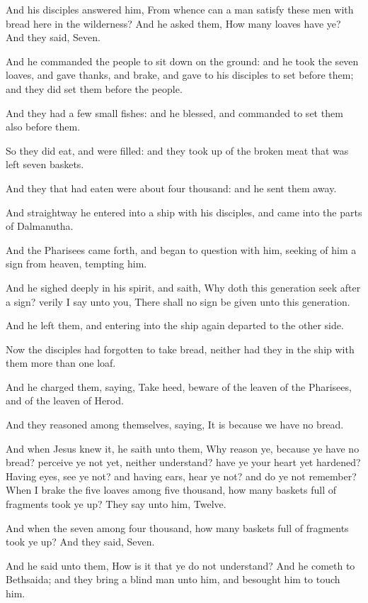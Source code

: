 \Verse And his disciples answered him, From whence can a man satisfy these men with bread here in the wilderness?  \Verse And he asked them, How many loaves have ye? And they said, Seven.

\Verse And he commanded the people to sit down on the ground: and he took the seven loaves, and gave thanks, and brake, and gave to his disciples to set before them; and they did set them before the people.

\Verse And they had a few small fishes: and he blessed, and commanded to set them also before them.

\Verse So they did eat, and were filled: and they took up of the broken meat that was left seven baskets.

\Verse And they that had eaten were about four thousand: and he sent them away.

\Verse And straightway he entered into a ship with his disciples, and came into the parts of Dalmanutha.

\Verse And the Pharisees came forth, and began to question with him, seeking of him a sign from heaven, tempting him.

\Verse And he sighed deeply in his spirit, and saith, Why doth this generation seek after a sign? verily I say unto you, There shall no sign be given unto this generation.

\Verse And he left them, and entering into the ship again departed to the other side.

\Verse Now the disciples had forgotten to take bread, neither had they in the ship with them more than one loaf.

\Verse And he charged them, saying, Take heed, beware of the leaven of the Pharisees, and of the leaven of Herod.

\Verse And they reasoned among themselves, saying, It is because we have no bread.

\Verse And when Jesus knew it, he saith unto them, Why reason ye, because ye have no bread? perceive ye not yet, neither understand?  have ye your heart yet hardened?  \Verse Having eyes, see ye not? and having ears, hear ye not? and do ye not remember?  \Verse When I brake the five loaves among five thousand, how many baskets full of fragments took ye up? They say unto him, Twelve.

\Verse And when the seven among four thousand, how many baskets full of fragments took ye up? And they said, Seven.

\Verse And he said unto them, How is it that ye do not understand?  \Verse And he cometh to Bethsaida; and they bring a blind man unto him, and besought him to touch him.

